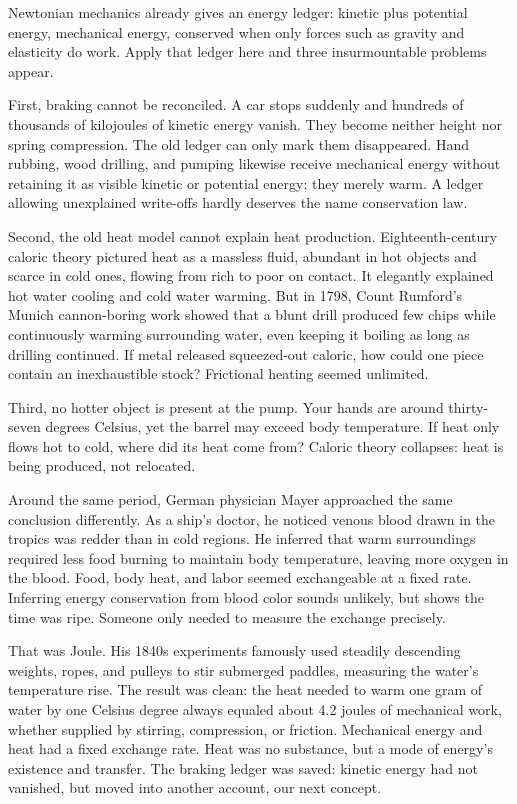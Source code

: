 
\begin{mainline}
Newtonian mechanics already gives an energy ledger: kinetic plus potential energy, mechanical energy, conserved when only forces such as gravity and elasticity do work. Apply that ledger here and three insurmountable problems appear.

First, braking cannot be reconciled. A car stops suddenly and hundreds of thousands of kilojoules of kinetic energy vanish. They become neither height nor spring compression. The old ledger can only mark them disappeared. Hand rubbing, wood drilling, and pumping likewise receive mechanical energy without retaining it as visible kinetic or potential energy; they merely warm. A ledger allowing unexplained write-offs hardly deserves the name conservation law.

Second, the old heat model cannot explain heat production. Eighteenth-century caloric theory pictured heat as a massless fluid, abundant in hot objects and scarce in cold ones, flowing from rich to poor on contact. It elegantly explained hot water cooling and cold water warming. But in 1798, Count Rumford's Munich cannon-boring work showed that a blunt drill produced few chips while continuously warming surrounding water, even keeping it boiling as long as drilling continued. If metal released squeezed-out caloric, how could one piece contain an inexhaustible stock? Frictional heating seemed unlimited.

Third, no hotter object is present at the pump. Your hands are around thirty-seven degrees Celsius, yet the barrel may exceed body temperature. If heat only flows hot to cold, where did its heat come from? Caloric theory collapses: heat is being produced, not relocated.

Around the same period, German physician Mayer approached the same conclusion differently. As a ship's doctor, he noticed venous blood drawn in the tropics was redder than in cold regions. He inferred that warm surroundings required less food burning to maintain body temperature, leaving more oxygen in the blood. Food, body heat, and labor seemed exchangeable at a fixed rate. Inferring energy conservation from blood color sounds unlikely, but shows the time was ripe. Someone only needed to measure the exchange precisely.

That was Joule. His 1840s experiments famously used steadily descending weights, ropes, and pulleys to stir submerged paddles, measuring the water's temperature rise. The result was clean: the heat needed to warm one gram of water by one Celsius degree always equaled about 4.2 joules of mechanical work, whether supplied by stirring, compression, or friction. Mechanical energy and heat had a fixed exchange rate. Heat was no substance, but a mode of energy's existence and transfer. The braking ledger was saved: kinetic energy had not vanished, but moved into another account, our next concept.
\end{mainline}

